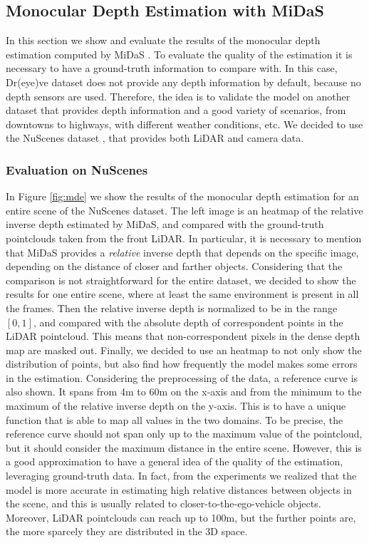\subsection{Monocular Depth Estimation with MiDaS}
In this section we show and evaluate the results of the monocular depth estimation 
computed by MiDaS \cite{midas}. To evaluate the quality of the estimation it 
is necessary to have a ground-truth information to compare with. In this case, 
Dr(eye)ve dataset does not provide any depth information by default, because no 
depth sensors are used. 
Therefore, the idea is to validate the model on another 
dataset that provides depth information and a good variety of scenarios, from 
downtowns to highways, with different weather conditions, etc. 
We decided to use the NuScenes dataset \cite{nuscenes}, that provides both 
LiDAR and camera data.

\subsubsection{Evaluation on NuScenes}
In Figure \ref{fig:mde} we show the results of the monocular depth estimation 
for an entire scene of the NuScenes dataset. The left image is an heatmap of 
the relative inverse depth estimated by MiDaS, and compared with the ground-truth 
pointclouds taken from the front LiDAR. In particular, it is necessary to mention 
that MiDaS provides a \emph{relative} inverse depth that depends on the specific 
image, depending on the distance of closer and farther objects.
Considering that the comparison is not straightforward for the entire dataset, 
we decided to show the results for one entire scene, where at least the same 
environment is present in all the frames. Then the relative inverse depth is 
normalized to be in the range $[0, 1]$, and compared with the absolute depth 
of correspondent points in the LiDAR pointcloud. This means that non-correspondent 
pixels in the dense depth map are masked out.
Finally, we decided to use an heatmap to not only show the distribution of points, 
but also find how frequently the model makes some errors in the estimation.
Considering the preprocessing of the data, a reference curve is also shown. 
It spans from 4m to 60m on the x-axis and from the 
minimum to the maximum of the relative inverse depth on the y-axis. This is to have 
a unique function that is able to map all values in the two domains.
To be precise, the reference curve should not span only up to the maximum 
value of the pointcloud, but it should consider the maximum distance in the 
entire scene. However, this is a good approximation to have a general idea 
of the quality of the estimation, leveraging ground-truth data. In fact, 
from the experiments we realized that the model is more accurate in estimating 
high relative distances between objects in the scene, and this is usually related 
to closer-to-the-ego-vehicle objects. Moreover, LiDAR pointclouds can reach 
up to 100m, but the further points are, the more sparcely they are distributed
in the 3D space.

